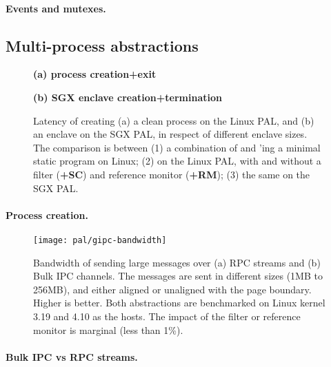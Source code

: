 \paragraph{Events and mutexes.}


\subsection{Multi-process abstractions}


\begin{figure*}[t!]
\centering
\footnotesize
{}
\parbox{0.59\textwidth}{\centering\bf (a) process creation+exit}
\parbox{0.39\textwidth}{\centering\bf (b) SGX enclave creation+termination}
\caption{Latency of creating (a) a clean process on the Linux PAL, and (b) an enclave on the SGX PAL, in respect of different enclave sizes.
The comparison is between (1) a combination of  and 'ing a minimal static program on Linux; (2)  on the Linux PAL, with and without a \seccomp{} filter ({\bf +SC}) and reference monitor ({\bf +RM}); (3) the same \hostapi{} on the SGX PAL.}
\label{fig:eval:pal:proc-latency}
\end{figure*}

\paragraph{Process creation.}




\begin{figure*}[t!]
\centering
\footnotesize
\texttt{[image: pal/gipc-bandwidth]}
\caption{Bandwidth of sending large messages over (a) RPC streams and (b) Bulk IPC channels. The messages are sent in different sizes (1MB to 256MB), and either aligned or unaligned with the page boundary.
Higher is better. Both abstractions are benchmarked on Linux kernel 3.19 and 4.10 as the hosts. The impact of the \seccomp{} filter or reference monitor is marginal (less than 1\%).}
\label{fig:eval:pal:gipc-bandwidth}
\end{figure*}


\paragraph{Bulk IPC vs RPC streams.}




